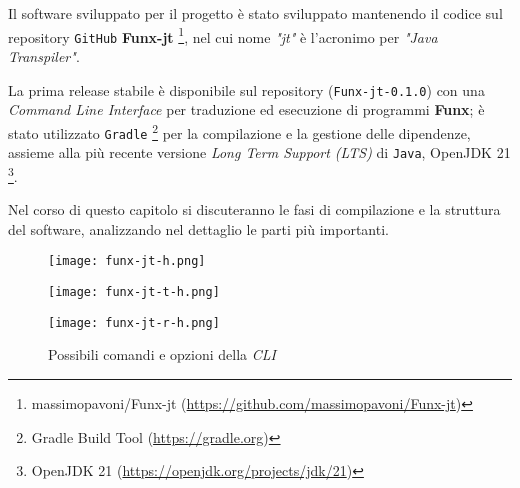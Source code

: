 \chapter{}
\label{chap:5-compiler}

Il software sviluppato per il progetto è stato sviluppato mantenendo il codice sul repository \texttt{GitHub} \textbf{Funx-jt}%
\footnote{massimopavoni/Funx-jt (\url{https://github.com/massimopavoni/Funx-jt})},
nel cui nome \textit{"jt"} è l'acronimo per \textit{"Java Transpiler"}.

\noindent La prima release stabile è disponibile sul repository (\texttt{Funx-jt-0.1.0})
con una \textit{Command Line Interface} per traduzione ed esecuzione di programmi \textbf{Funx};
è stato utilizzato \texttt{Gradle}%
\footnote{Gradle Build Tool (\url{https://gradle.org})}
per la compilazione e la gestione delle dipendenze,
assieme alla più recente versione \textit{Long Term Support (LTS)} di \texttt{Java}, OpenJDK 21%
\footnote{OpenJDK 21 (\url{https://openjdk.org/projects/jdk/21})}.

Nel corso di questo capitolo si discuteranno le fasi di compilazione e la struttura del software,
analizzando nel dettaglio le parti più importanti.

\begin{figure}
    \vspace{4mm}
    \begin{minipage}{0.85\textwidth}
        \texttt{[image: funx-jt-h.png]}
        \vspace{2mm}
    \end{minipage}
    \begin{minipage}{0.85\textwidth}
        \texttt{[image: funx-jt-t-h.png]}
        \vspace{2mm}
    \end{minipage}
    \begin{minipage}{0.85\textwidth}
        \texttt{[image: funx-jt-r-h.png]}
    \end{minipage}
    \caption{Possibili comandi e opzioni della \textit{CLI}}
    \label{fig:5-compiler-cli}
\end{figure}

\newpage







